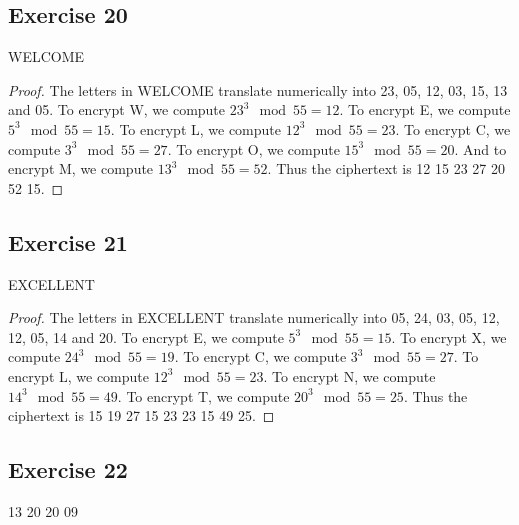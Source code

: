 \documentclass[14pt]{extarticle}
\begin{document}
\subsection{Exercise 20}
WELCOME

\begin{proof}
        The letters in WELCOME translate numerically into 23, 05, 12, 03, 15, 13 and 05. To encrypt W, we compute \(23^3 \mod
        55 = 12\). To encrypt E, we compute \(5^3 \mod 55 = 15\). To encrypt L, we compute \(12^3 \mod 55 = 23\). To encrypt
        C, we compute \(3^3 \mod 55 = 27\). To encrypt O, we compute \(15^3 \mod 55 = 20\). And to encrypt M, we compute
        \(13^3 \mod 55 = 52\). Thus the ciphertext is 12 15 23 27 20 52 15.
\end{proof}

\subsection{Exercise 21}
EXCELLENT

\begin{proof}
        The letters in EXCELLENT translate numerically into 05, 24,  03, 05, 12, 12, 05, 14 and 20. To encrypt E, we compute
        \(5^3 \mod 55 = 15\). To encrypt X, we compute \(24^3 \mod 55 = 19\). To encrypt C, we compute \(3^3 \mod 55 = 27\).
        To encrypt L, we compute \(12^3 \mod 55 = 23\). To encrypt N, we compute \(14^3 \mod 55 = 49\). To encrypt T, we
        compute \(20^3 \mod 55 = 25\). Thus the ciphertext is 15 19 27 15 23 23 15 49 25.
\end{proof}

\subsection{Exercise 22}
13 20 20 09
\end{document}
